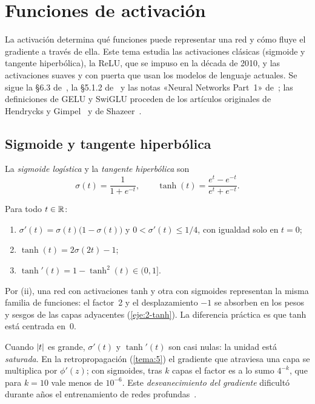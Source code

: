 \chapter{Funciones de activación}
\label{tema:2}

La activación determina qué funciones puede representar una red y cómo fluye el gradiente a través de ella. Este tema estudia las activaciones clásicas (sigmoide y tangente hiperbólica), la ReLU, que se impuso en la década de 2010, y las activaciones suaves y con puerta que usan los modelos de lenguaje actuales. Se sigue la §6.3 de~\cite{gbc}, la §5.1.2 de~\cite{d2l} y las notas «Neural Networks Part~1» de~\cite{cs231n}; las definiciones de GELU y SwiGLU proceden de los artículos originales de Hendrycks y Gimpel~\cite{hendrycks} y de Shazeer~\cite{shazeer}.

\section{Sigmoide y tangente hiperbólica}

\begin{definicion}
La \emph{sigmoide logística} y la \emph{tangente hiperbólica} son
\[
\sigma(t)=\frac{1}{1+e^{-t}},\qquad \tanh(t)=\frac{e^{t}-e^{-t}}{e^{t}+e^{-t}}.
\]
\end{definicion}

\begin{proposicion}\label{prop:sigmoide}
Para todo $t\in\mathbb{R}$:
\begin{enumerate}
  \item $\sigma'(t)=\sigma(t)\bigl(1-\sigma(t)\bigr)$ y $0<\sigma'(t)\le 1/4$, con igualdad solo en $t=0$;
  \item $\tanh(t)=2\sigma(2t)-1$;
  \item $\tanh'(t)=1-\tanh^{2}(t)\in(0,1]$.
\end{enumerate}
\end{proposicion}

Por (ii), una red con activaciones tanh y otra con sigmoides representan la misma familia de funciones: el factor~2 y el desplazamiento $-1$ se absorben en los pesos y sesgos de las capas adyacentes (\cref{eje:2-tanh}). La diferencia práctica es que tanh está centrada en~0.

\begin{observacion}\label{obs:desvanecimiento}
Cuando $\lvert t\rvert$ es grande, $\sigma'(t)$ y $\tanh'(t)$ son casi nulas: la unidad está \emph{saturada}. En la retropropagación (\cref{tema:5}) el gradiente que atraviesa una capa se multiplica por $\phi'(z)$; con sigmoides, tras $k$ capas el factor es a lo sumo $4^{-k}$, que para $k=10$ vale menos de $10^{-6}$. Este \emph{desvanecimiento del gradiente} dificultó durante años el entrenamiento de redes profundas~\cite[§6.3.2]{gbc}.
\end{observacion}

